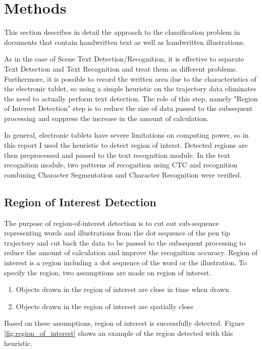 \section{Methods}

This section describes in detail the approach to the classification problem
in documents that contain handwritten text as well as handwritten illustrations.

As in the case of Scene Text Detection/Recognition, it is effective to separate Text Detection
and Text Recognition and treat them as different problems.
Furthermore, it is possible to record the written area due to the characteristics of the electronic tablet,
so using a simple heuristic on the trajectory data eliminates the need to actually perform text detection.
The role of this step, namely "Region of Interest Detection" step is to reduce the size of data
passed to the subsequent processing and suppress the increase in the amount of calculation.

In general, electronic tablets have severe limitations on computing power, so in this report
I used the heuristic to detect region of interst. Detected regions are then preprocessed
and passed to the text recognition module. In the text recognition module,
two patterns of recognition using CTC and recognition combining
Character Segmentation and Character Recognition were verified.


\subsection{Region of Interest Detection}

The purpose of region-of-interest detection is to cut out sub-sequence
representing words and illustrations from the dot sequence of the pen tip trajectory
and cut back the data to be passed to the subsequent processing to
reduce the amount of calculation and improve the recognition accuracy.
Region of interest is a region including a dot sequence of the word or the illustration.
To specify the region, two assumptions are made on region of interest.

\begin{enumerate}
    \item Objects drawn in the region of interest are close in time when drawn
    \item Objects drawn in the region of interest are spatially close
\end{enumerate}

Based on these assumptions, region of interest is successfully detected.
Figure \ref{fig:region_of_interest} shows an example of the region detected with
this heuristic.


